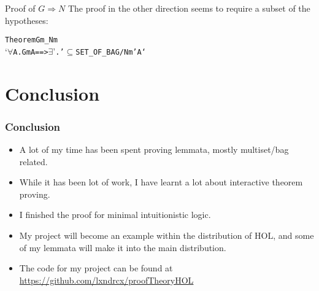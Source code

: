 \documentclass[english,svgnames,hide notes,12pt]{beamer}
\theoremstyle{definition}
\theoremstyle{remark}
\begin{document}
\begin{frame}[fragile]{Proof of $G\Rightarrow N$}
    The proof in the other direction seems to require a subset of the hypotheses:
    \begin{alltt}
Theorem Gm_Nm
`\(\forall\) \textGamma A. Gm \textGamma A ==> \(\exists\) \textGamma'. \textGamma' \(\subseteq\) SET_OF_BAG \textGamma /\bs{} Nm \textGamma' A`
    \end{alltt}
\end{frame}

\section{Conclusion}

\begin{frame}
    \frametitle{Conclusion}
    \begin{itemize}
        \item A lot of my time has been spent proving lemmata, mostly multiset/bag related.
        \item While it has been lot of work, I have learnt a lot about interactive theorem proving.
        \item I finished the proof for minimal intuitionistic logic.
        \item My project will become an example within the distribution of HOL, and some of my lemmata will make it into the main distribution.
        \item The code for my project can be found at \url{https://github.com/lxndrcx/proofTheoryHOL}
    \end{itemize}
\end{frame}
\end{document}
